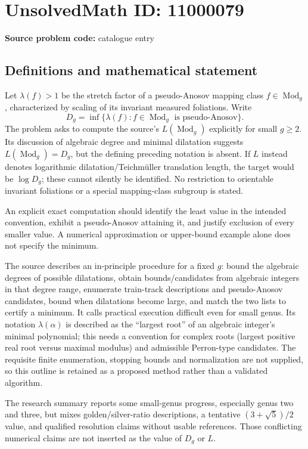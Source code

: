 \documentclass[11pt]{article}
\begin{document}
\section*{UnsolvedMath ID: 11000079}
\textbf{Source problem code:} catalogue entry
\subsection{Definitions and mathematical statement}
Let \(\lambda(f)>1\) be the stretch factor of a pseudo-Anosov mapping class \(f\in\operatorname{Mod}_g\), characterized by scaling of its invariant measured foliations. Write
\[D_g=\inf\{\lambda(f):f\in\operatorname{Mod}_g\text{ is pseudo-Anosov}\}.\]
The problem asks to compute the source's \(L(\operatorname{Mod}_g)\) explicitly for small \(g\geq2\). Its discussion of algebraic degree and minimal dilatation suggests \(L(\operatorname{Mod}_g)=D_g\), but the defining preceding notation is absent. If \(L\) instead denotes logarithmic dilatation/Teichm\"uller translation length, the target would be \(\log D_g\); these cannot silently be identified. No restriction to orientable invariant foliations or a special mapping-class subgroup is stated.

An explicit exact computation should identify the least value in the intended convention, exhibit a pseudo-Anosov attaining it, and justify exclusion of every smaller value. A numerical approximation or upper-bound example alone does not specify the minimum.

The source describes an in-principle procedure for a fixed \(g\): bound the algebraic degrees of possible dilatations, obtain bounds/candidates from algebraic integers in that degree range, enumerate train-track descriptions and pseudo-Anosov candidates, bound when dilatations become large, and match the two lists to certify a minimum. It calls practical execution difficult even for small genus. Its notation \(\lambda(\alpha)\) is described as the ``largest root'' of an algebraic integer's minimal polynomial; this needs a convention for complex roots (largest positive real root versus maximal modulus) and admissible Perron-type candidates. The requisite finite enumeration, stopping bounds and normalization are not supplied, so this outline is retained as a proposed method rather than a validated algorithm.

The research summary reports some small-genus progress, especially genus two and three, but mixes golden/silver-ratio descriptions, a tentative \((3+\sqrt5)/2\) value, and qualified resolution claims without usable references. Those conflicting numerical claims are not inserted as the value of \(D_g\) or \(L\).
\end{document}

